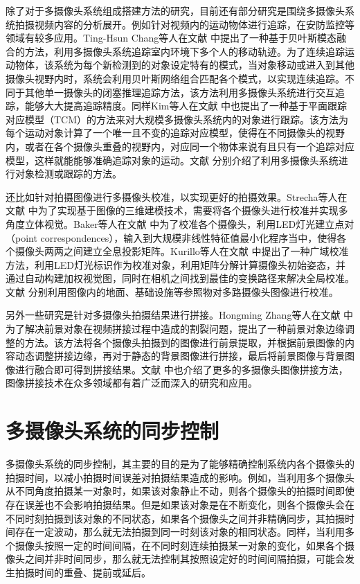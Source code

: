 除了对于多摄像头系统组成搭建方法的研究，目前还有部分研究是围绕多摄像头系统拍摄视频内容的分析展开。例如针对视频内的运动物体进行追踪，在安防监控等领域有较多应用。Ting-Hsun Chang等人在文献 \cite{11} 中提出了一种基于贝叶斯模态融合的方法，利用多摄像头系统追踪室内环境下多个人的移动轨迹。为了连续追踪运动物体，该系统为每个新检测到的对象设定特有的模式，当对象移动或进入到其他摄像头视野内时，系统会利用贝叶斯网络组合匹配各个模式，以实现连续追踪。不同于其他单一摄像头的闭塞推理追踪方法，该方法利用多摄像头系统进行交互追踪，能够大大提高追踪精度。同样Kim等人在文献 \cite{12} 中也提出了一种基于平面跟踪对应模型（TCM）的方法来对大规模多摄像头系统内的对象进行跟踪。该方法为每个运动对象计算了一个唯一且不变的追踪对应模型，使得在不同摄像头的视野内，或者在各个摄像头重叠的视野内，对应同一个物体来说有且只有一个追踪对应模型，这样就能能够准确追踪对象的运动。文献 \cite{zha2013detecting, saini2014w3, wang2013intelligent} 分别介绍了利用多摄像头系统进行对象检测或跟踪的方法。

还比如针对拍摄图像进行多摄像头校准，以实现更好的拍摄效果。Strecha等人在文献 \cite{13} 中为了实现基于图像的三维建模技术，需要将各个摄像头进行校准并实现多角度立体视觉。Baker等人在文献 \cite{14} 中为了校准各个摄像头，利用LED灯光建立点对（point correspondences），输入到大规模非线性特征值最小化程序当中，使得各个摄像头两两之间建立全息投影矩阵。Kurillo等人在文献 \cite{15} 中提出了一种广域校准方法，利用LED灯光标识作为校准对象，利用矩阵分解计算摄像头初始姿态，并通过自动构建加权视觉图，同时在相机之间找到最佳的变换路径来解决全局校准。文献 \cite{theriault2014protocol, knorr2013online, heng2014infrastructure} 分别利用图像内的地面、基础设施等参照物对多路摄像头图像进行校准。

另外一些研究是针对多摄像头拍摄结果进行拼接。Hongming Zhang等人在文献 \cite{16} 中为了解决前景对象在视频拼接过程中造成的割裂问题，提出了一种前景对象边缘调整的方法。该方法将各个摄像头拍摄到的图像进行前景提取，并根据前景图像的内容动态调整拼接边缘，再对于静态的背景图像进行拼接，最后将前景图像与背景图像进行融合即可得到拼接结果。文献 \cite{malesa2014multi, zhong2014color, lu2016photometric} 中也介绍了更多的多摄像头图像拼接方法，图像拼接技术在众多领域都有着广泛而深入的研究和应用。

\section{多摄像头系统的同步控制}

多摄像头系统的同步控制，其主要的目的是为了能够精确控制系统内各个摄像头的拍摄时间，以减小拍摄时间误差对拍摄结果造成的影响。例如，当利用多个摄像头从不同角度拍摄某一对象时，如果该对象静止不动，则各个摄像头的拍摄时间即使存在误差也不会影响拍摄结果。但是如果该对象是在不断变化，则各个摄像头会在不同时刻拍摄到该对象的不同状态，如果各个摄像头之间并非精确同步，其拍摄时间存在一定波动，那么就无法拍摄到同一时刻该对象的相同状态。同样，当利用多个摄像头按照一定的时间间隔，在不同时刻连续拍摄某一对象的变化，如果各个摄像头之间并非时间同步，那么就无法控制其按照设定好的时间间隔拍摄，可能会发生拍摄时间的重叠、提前或延后。

